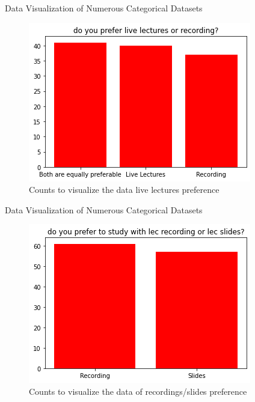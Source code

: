 \documentclass{beamer}
\begin{document}
\begin{frame}
\begin{block}{Data Visualization of Numerous Categorical Datasets}
\begin{figure}[hbtp]
\caption{Counts to visualize the data live lectures preference}
\centering
\includegraphics[scale=0.60]{reclivelec.png}
\end{figure}
\end{block}
\end{frame}

\begin{frame}
\begin{block}{Data Visualization of Numerous Categorical Datasets}
\begin{figure}[hbtp]
\caption{Counts to visualize the data of recordings/slides preference}
\centering
\includegraphics[scale=0.60]{recslides.png}
\end{figure}
\end{block}
\end{frame}
\end{document}
